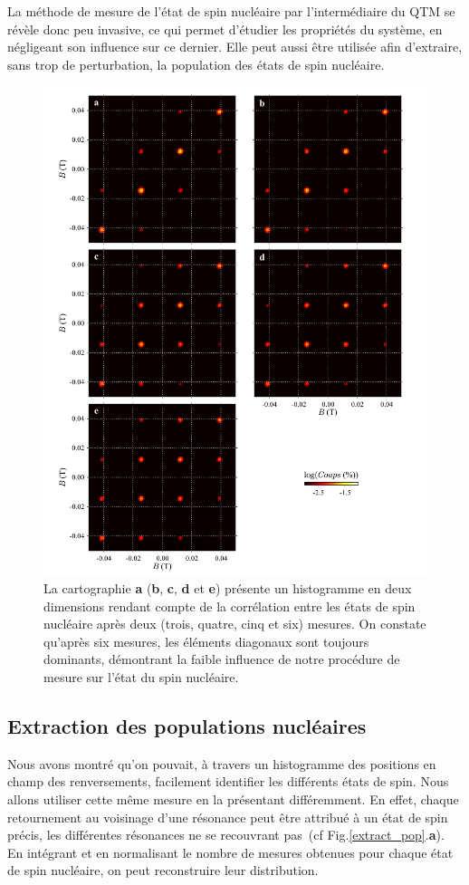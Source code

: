 La méthode de mesure de l'état de spin nucléaire par l'intermédiaire du QTM se révèle donc peu invasive, ce qui permet d'étudier les propriétés du système, en négligeant son influence sur ce dernier. Elle peut aussi être utilisée afin d'extraire, sans trop de perturbation, la population des états de spin nucléaire.

\begin{figure}
\includegraphics[scale=0.45]{Resultats/MesureInfl/MesureInfl.pdf} 
\caption{La cartographie \textbf{a} (\textbf{b}, \textbf{c}, \textbf{d} et \textbf{e}) présente un histogramme en deux dimensions rendant compte de la corrélation entre les états de spin nucléaire après deux (trois, quatre, cinq et six) mesures. On constate qu'après six mesures, les éléments diagonaux sont toujours dominants, démontrant la faible influence de notre procédure de mesure sur l'état du spin nucléaire.}
\label{evolution_mesures}
\end{figure}

\subsection{Extraction des populations nucléaires}
Nous avons montré qu'on pouvait, à travers un histogramme des positions en champ des renversements, facilement identifier les différents états de spin. Nous allons utiliser cette m\^eme mesure en la présentant différemment. En effet, chaque retournement au voisinage d'une résonance peut \^etre attribué à un état de spin précis, les différentes résonances ne se recouvrant pas~(cf Fig.\ref{extract_pop}.\textbf{a}). En intégrant et en normalisant le nombre de mesures obtenues pour chaque état de spin nucléaire, on peut reconstruire leur distribution. 

